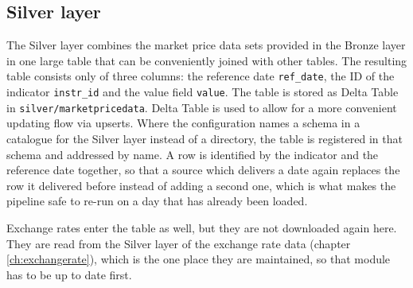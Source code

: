 \subsection{Silver layer}

The Silver layer combines the market price data sets provided in the Bronze layer in one large table that can be conveniently joined with other tables. The resulting table consists only of three columns: the reference date \verb|ref_date|, the ID of the indicator \verb|instr_id| and the value field \verb|value|. The table is stored as Delta Table in \verb|silver/marketpricedata|. Delta Table is used to allow for a more convenient updating flow via upserts. Where the configuration names a schema in a catalogue for the Silver layer instead of a directory, the table is registered in that schema and addressed by name. A row is identified by the indicator and the reference date together, so that a source which delivers a date again replaces the row it delivered before instead of adding a second one, which is what makes the pipeline safe to re-run on a day that has already been loaded.

Exchange rates enter the table as well, but they are not downloaded again here. They are read from the Silver layer of the exchange rate data (chapter \ref{ch:exchangerate}), which is the one place they are maintained, so that module has to be up to date first.

